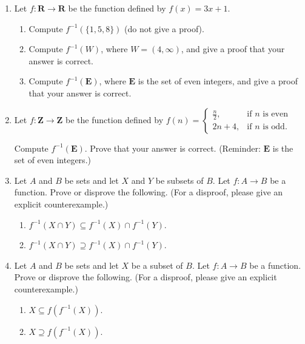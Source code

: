 \begin{enumerate}
\item Let $f \colon \mathbf{R} \to \mathbf{R}$ be the function defined by $f(x) = 3x+1$. 
 \begin{enumerate}
 \item Compute $f^{-1}(\{1,5,8\})$ (do not give a proof).
 \item Compute $f^{-1}(W)$, where $W = (4,\infty)$, and give a proof that your answer is correct.
 \item Compute $f^{-1}(\mathbf{E})$, where $\mathbf{E}$ is the set of even integers, and give a proof that your answer is correct.
 \end{enumerate}

\item Let $f \colon \mathbf{Z} \to \mathbf{Z}$ be the function defined by $f(n) =
 \begin{cases}
 \frac{n}{2}, & \text{if $n$ is even} \\
 2n+4, & \text{if $n$ is odd}.
 \end{cases}
 $
 
 Compute $f^{-1}(\mathbf{E})$. Prove that your answer is correct. (Reminder: $\mathbf{E}$ is the set of even integers.)

\item Let $A$ and $B$ be sets and let $X$ and $Y$ be subsets of $B$. Let $f\colon A \to B$ be a function. Prove or disprove the following. (For a disproof, please give an explicit counterexample.) 
  \begin{enumerate}
  \item $f^{-1}(X \cap Y) \subseteq f^{-1}(X) \cap f^{-1}(Y)$.
  \item $f^{-1}(X \cap Y) \supseteq f^{-1}(X) \cap f^{-1}(Y)$.
  \end{enumerate}


\item Let $A$ and $B$ be sets and let $X$ be a subset of $B$. Let $f\colon A \to B$ be a function. Prove or disprove the following. (For a disproof, please give an explicit counterexample.)
 \begin{enumerate}
 \item $X \subseteq f(f^{-1}(X))$.
 \item $X \supseteq f(f^{-1}(X))$.
 \end{enumerate}

 

\end{enumerate}
